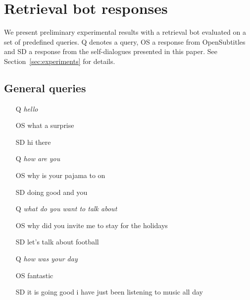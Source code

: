 \documentclass[11pt,a4paper]{article}
\begin{document}
\section{Retrieval bot responses}\label{sec:exp}
We present preliminary experimental results with a retrieval bot evaluated on a set of predefined queries. Q denotes a query, OS a response from OpenSubtitles and SD a response from the self-dialogues presented in this paper. See Section~\ref{sec:experiments} for details.
\subsection{General queries}
\begin{itemize}
\itemsep0em
\item[Q] \emph{hello}
\item[OS] what a surprise
\item[SD] hi there
\end{itemize}
\begin{itemize}
\itemsep0em
\item[Q] \emph{how are you}
\item[OS] why is your pajama to on
\item[SD] doing good and you
\end{itemize}
\begin{itemize}
\itemsep0em
\item[Q] \emph{what do you want to talk about}
\item[OS] why did you invite me to stay for the holidays
\item[SD] let's talk about football
\end{itemize}
\begin{itemize}
\itemsep0em
\item[Q] \emph{how was your day}
\item[OS] fantastic
\item[SD] it is going good i have just been listening to  music all day
\end{itemize}
\end{document}
